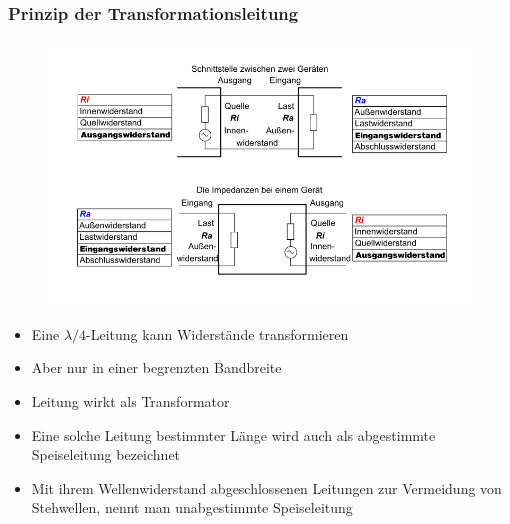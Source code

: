 \begin{frame}
  \frametitle{Prinzip der Transformationsleitung}
  \begin{center}
    \begin{figure}
      \includegraphics[width=\textwidth,height=.25\textheight,keepaspectratio]{a10/800px-EingangswiderstandAusgangswiderstandA.png}
    \end{figure}
  \end{center}
  \begin{itemize}
    \item Eine $\lambda /4$-Leitung kann Widerstände transformieren
    \item Aber nur in einer begrenzten Bandbreite
    \item Leitung wirkt als Transformator
    \item Eine solche Leitung bestimmter Länge wird auch als abgestimmte Speiseleitung bezeichnet
    \item Mit ihrem Wellenwiderstand abgeschlossenen Leitungen zur Vermeidung von Stehwellen, nennt man unabgestimmte Speiseleitung
  \end{itemize}
\end{frame}

